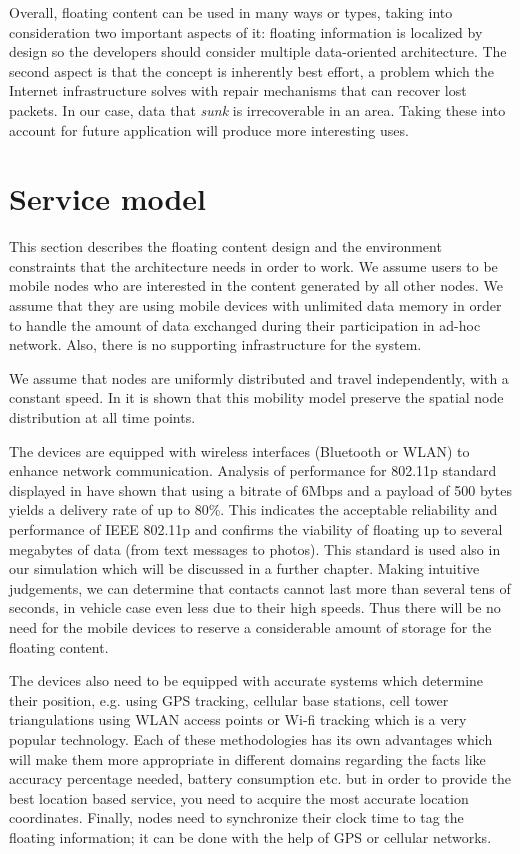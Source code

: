 Overall, floating content can be used in many ways or types, taking into
consideration two important aspects of it: floating information is localized by
design so the developers should consider multiple data-oriented architecture.
The second aspect is that the concept is inherently best effort, a problem which
the Internet infrastructure solves with repair mechanisms that can recover lost
packets. In our case, data that {\it sunk} is irrecoverable in an area. Taking
these into account for future application will produce more interesting uses.

\section{Service model}

This section describes the floating content design and the environment
constraints that the architecture needs in order to work.
We assume users to be mobile nodes who are interested in the content generated
by all other nodes. We assume that they are using mobile devices with unlimited
data memory in order to handle the amount of data exchanged during their
participation in ad-hoc network. Also, there is no supporting infrastructure for
the system.

We assume that nodes are uniformly distributed and travel independently, with a
constant speed. In \cite{uniform_distribution} it is shown that this mobility
model preserve the spatial node distribution at all time points.

The devices are equipped with wireless interfaces (Bluetooth or WLAN) to enhance
network communication. Analysis of performance for 802.11p standard displayed in
\cite {performance802.11} have shown that using a bitrate of 6Mbps and a
payload of 500 bytes yields a delivery rate of up to 80\%. This indicates the acceptable
reliability and performance of IEEE 802.11p and confirms the viability of
floating up to several megabytes of data (from text messages to photos). This
standard is used also in our simulation which will be discussed in a further
chapter. Making intuitive judgements, we can determine that contacts cannot last
more than several tens of seconds, in vehicle case even less due to their high
speeds. Thus there will be no need for the mobile devices to reserve a
considerable amount of storage for the floating content.

The devices also need to be equipped with accurate systems which determine their
position, e.g. using GPS tracking, cellular base stations, cell tower
triangulations using WLAN access points or Wi-fi tracking which is a very
popular technology. Each of these methodologies has its own advantages which
will make them more appropriate in different domains regarding the facts like
accuracy percentage needed, battery consumption etc. but in order to provide the
best location based service, you need to acquire the most accurate location
coordinates. Finally, nodes need to synchronize their clock time to tag the
floating information; it can be done with the help of GPS or cellular networks.


